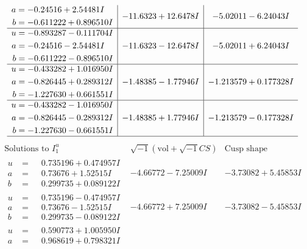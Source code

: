 \documentclass[1p]{elsarticle_modified}
\theoremstyle{definition}
\newcommand{\I}{\sqrt{-1}}
\begin{document}
$$\begin{array}{c|c|c}
\begin{aligned}
a &= -0.24516 + 2.54481 I \\
b &= -0.611222 + 0.896510 I\end{aligned}
 & -11.6323 + 12.6478 I & -5.02011 - 6.24043 I \\ \hline\begin{aligned}
u &= -0.893287 - 0.111704 I \\
a &= -0.24516 - 2.54481 I \\
b &= -0.611222 - 0.896510 I\end{aligned}
 & -11.6323 - 12.6478 I & -5.02011 + 6.24043 I \\ \hline\begin{aligned}
u &= -0.433282 + 1.016950 I \\
a &= -0.826445 + 0.289312 I \\
b &= -1.227630 + 0.661551 I\end{aligned}
 & -1.48385 - 1.77946 I & -1.213579 + 0.177328 I \\ \hline\begin{aligned}
u &= -0.433282 - 1.016950 I \\
a &= -0.826445 - 0.289312 I \\
b &= -1.227630 - 0.661551 I\end{aligned}
 & -1.48385 + 1.77946 I & -1.213579 - 0.177328 I\\
 \hline 
 \end{array}$$\newpage$$\begin{array}{c|c|c}  
\text{Solutions to }I^u_{1}& \I (\text{vol} + \sqrt{-1}CS) & \text{Cusp shape}\\
 \hline 
\begin{aligned}
u &= \phantom{-}0.735196 + 0.474957 I \\
a &= \phantom{-}0.73676 + 1.52515 I \\
b &= \phantom{-}0.299735 + 0.089122 I\end{aligned}
 & -4.66772 - 7.25009 I & -3.73082 + 5.45853 I \\ \hline\begin{aligned}
u &= \phantom{-}0.735196 - 0.474957 I \\
a &= \phantom{-}0.73676 - 1.52515 I \\
b &= \phantom{-}0.299735 - 0.089122 I\end{aligned}
 & -4.66772 + 7.25009 I & -3.73082 - 5.45853 I \\ \hline\begin{aligned}
u &= \phantom{-}0.590773 + 1.005950 I \\
a &= \phantom{-}0.968619 + 0.798321 I \\

\end{aligned}
\end{array}$$
\end{document}
